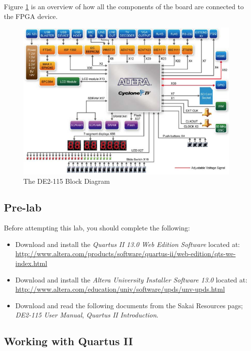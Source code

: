 Figure \ref{fig:DE2Block} is an overview of how all the components of the board are connected to the FPGA device.

\begin{figure}[H]
	\centering
	\includegraphics[width=170mm]{Lab1/figures/DE2-115Block.png}
	\caption{The DE2-115 Block Diagram}
	\label{fig:DE2Block}
\end{figure}

\subsection{Pre-lab}

Before attempting this lab, you should complete the following:

\begin{itemize}
	\item Download and install the \emph{Quartus II 13.0 Web Edition Software} located at:
	 \\ \url{http://www.altera.com/products/software/quartus-ii/web-edition/qts-we-index.html}

	\item Download and install the \emph{Altera University Installer Software 13.0} located at:
	 \\ \url{http://www.altera.com/education/univ/software/upds/unv-upds.html}

	\item Download and read the following documents from the Sakai Resources pags;  \emph{DE2-115 User Manual}, \emph{Quartus II Introduction}.
\end{itemize}
 
\subsection{Working with Quartus II}

